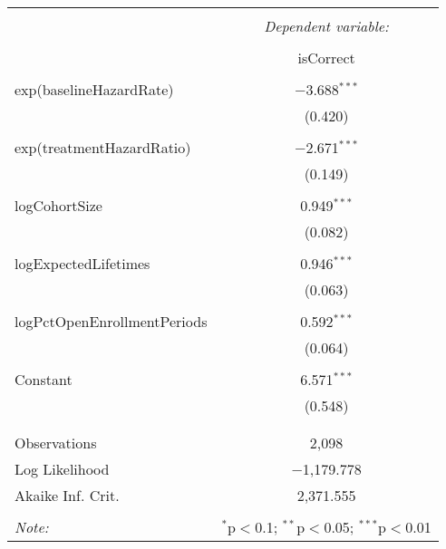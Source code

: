 
\begin{table}[!htbp] \centering 
  \caption{} 
  \label{} 
\begin{tabular}{@{\extracolsep{5pt}}lc} 
\\[-1.8ex]\hline 
\hline \\[-1.8ex] 
 & \multicolumn{1}{c}{\textit{Dependent variable:}} \\ 
\cline{2-2} 
\\[-1.8ex] & isCorrect \\ 
\hline \\[-1.8ex] 
 exp(baselineHazardRate) & $-$3.688$^{***}$ \\ 
  & (0.420) \\ 
  & \\ 
 exp(treatmentHazardRatio) & $-$2.671$^{***}$ \\ 
  & (0.149) \\ 
  & \\ 
 logCohortSize & 0.949$^{***}$ \\ 
  & (0.082) \\ 
  & \\ 
 logExpectedLifetimes & 0.946$^{***}$ \\ 
  & (0.063) \\ 
  & \\ 
 logPctOpenEnrollmentPeriods & 0.592$^{***}$ \\ 
  & (0.064) \\ 
  & \\ 
 Constant & 6.571$^{***}$ \\ 
  & (0.548) \\ 
  & \\ 
\hline \\[-1.8ex] 
Observations & 2,098 \\ 
Log Likelihood & $-$1,179.778 \\ 
Akaike Inf. Crit. & 2,371.555 \\ 
\hline 
\hline \\[-1.8ex] 
\textit{Note:}  & \multicolumn{1}{r}{$^{*}$p$<$0.1; $^{**}$p$<$0.05; $^{***}$p$<$0.01} \\ 
\end{tabular} 
\end{table}  
